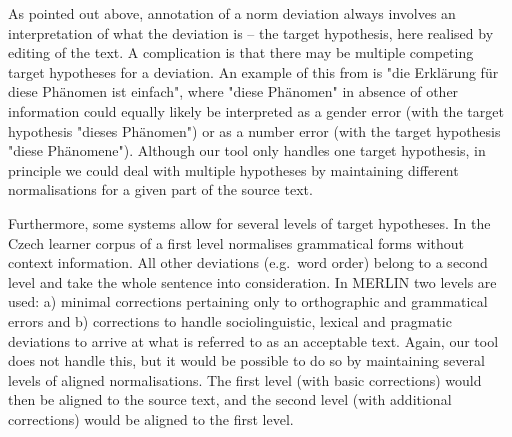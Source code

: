 \documentclass[10pt, a4paper]{article}
\newcommand{\dan}[1]{{\color{Fuchsia}{Dan: #1}}}
\newcommand{\elena}[1]{{\color{BrickRed}{Elena: #1}}}
\newcommand{\mats}[1]{{\color{Blue}{Mats: #1}}}
\newcommand{\normAnn}[0]{our tool }
\begin{document}




As pointed out above, annotation of a norm deviation always involves an interpretation of what the deviation is -- the target hypothesis, here realised by editing of the text. A complication is that there may be multiple competing target hypotheses for a deviation. An example of this from  is "die Erklärung für diese Phänomen ist einfach", where "diese Ph{\"a}nomen" in absence of other information could equally likely be interpreted as a gender error (with the target hypothesis "dieses Ph{\"a}nomen") or as a number error (with the target hypothesis "diese Ph{\"a}nomene"). Although \normAnn only handles one target hypothesis, in principle we could deal with multiple hypotheses by maintaining different normalisations for a given part of the source text.

Furthermore, some systems allow for several levels of target hypotheses. In the Czech learner corpus of  a
first level normalises grammatical forms without context information. All other deviations (e.g.\ word order) belong to a second level and take the whole sentence into consideration.
In MERLIN \cite{MERLIN2014} two levels are used: a) minimal corrections pertaining only to orthographic and grammatical errors and b) corrections to handle sociolinguistic, lexical and pragmatic deviations to arrive at what is referred to as an acceptable text. Again, \normAnn does not handle this, but it would be possible to do so by maintaining several levels of aligned normalisations. The first level (with basic corrections) would then be aligned to the source text, and the second level (with additional corrections) would be aligned to the first level.
\end{document}

